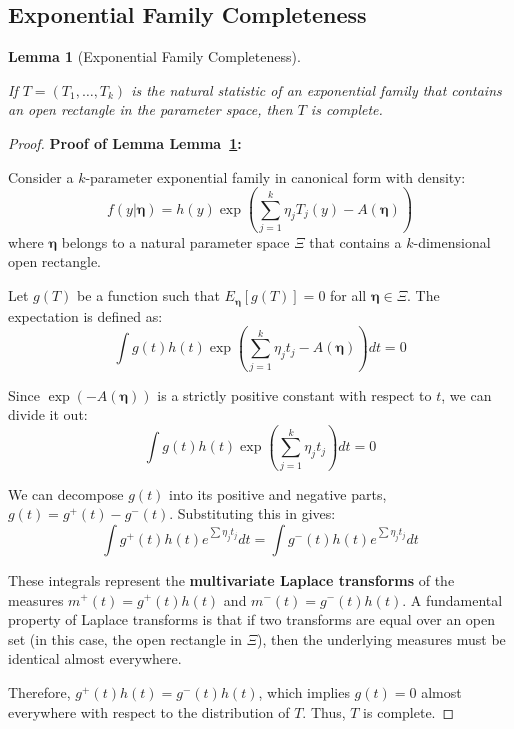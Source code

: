 \documentclass[
  letterpaper,
  DIV=11,
  numbers=noendperiod]{scrreprt}
\renewcommand{\[}{\begin{equation}}
\renewcommand{\]}{\end{equation}}
\theoremstyle{definition}
\theoremstyle{plain}
\theoremstyle{plain}
\theoremstyle{plain}
\theoremstyle{definition}
\theoremstyle{plain}
\newtheorem{lemma}{Lemma}[chapter]
\theoremstyle{remark}
\begin{document}
\subsection{Exponential Family
Completeness}\label{exponential-family-completeness}

\begin{lemma}[Exponential Family
Completeness]\protect\hypertarget{lem-exponential-complete}{}\label{lem-exponential-complete}

If \(T = (T_1, \dots, T_k)\) is the natural statistic of an exponential
family that contains an open rectangle in the parameter space, then
\(T\) is complete.

\end{lemma}

\begin{proof}
\textbf{Proof of Lemma Lemma~\ref{lem-exponential-complete}:}

Consider a \(k\)-parameter exponential family in canonical form with
density:
\[f(y|\boldsymbol{\eta}) = h(y) \exp\left( \sum_{j=1}^k \eta_j T_j(y) - A(\boldsymbol{\eta}) \right)\]
where \(\boldsymbol{\eta}\) belongs to a natural parameter space \(\Xi\)
that contains a \(k\)-dimensional open rectangle.

Let \(g(T)\) be a function such that \(E_{\boldsymbol{\eta}}[g(T)] = 0\)
for all \(\boldsymbol{\eta} \in \Xi\). The expectation is defined as:
\[\int g(t) h(t) \exp\left( \sum_{j=1}^k \eta_j t_j - A(\boldsymbol{\eta}) \right) dt = 0\]

Since \(\exp(-A(\boldsymbol{\eta}))\) is a strictly positive constant
with respect to \(t\), we can divide it out:
\[\int g(t) h(t) \exp\left( \sum_{j=1}^k \eta_j t_j \right) dt = 0\]

We can decompose \(g(t)\) into its positive and negative parts,
\(g(t) = g^+(t) - g^-(t)\). Substituting this in gives:
\[\int g^+(t) h(t) e^{\sum \eta_j t_j} dt = \int g^-(t) h(t) e^{\sum \eta_j t_j} dt\]

These integrals represent the \textbf{multivariate Laplace transforms}
of the measures \(m^+(t) = g^+(t)h(t)\) and \(m^-(t) = g^-(t)h(t)\). A
fundamental property of Laplace transforms is that if two transforms are
equal over an open set (in this case, the open rectangle in \(\Xi\)),
then the underlying measures must be identical almost everywhere.

Therefore, \(g^+(t)h(t) = g^-(t)h(t)\), which implies \(g(t) = 0\)
almost everywhere with respect to the distribution of \(T\). Thus, \(T\)
is complete.
\end{proof}
\end{document}
